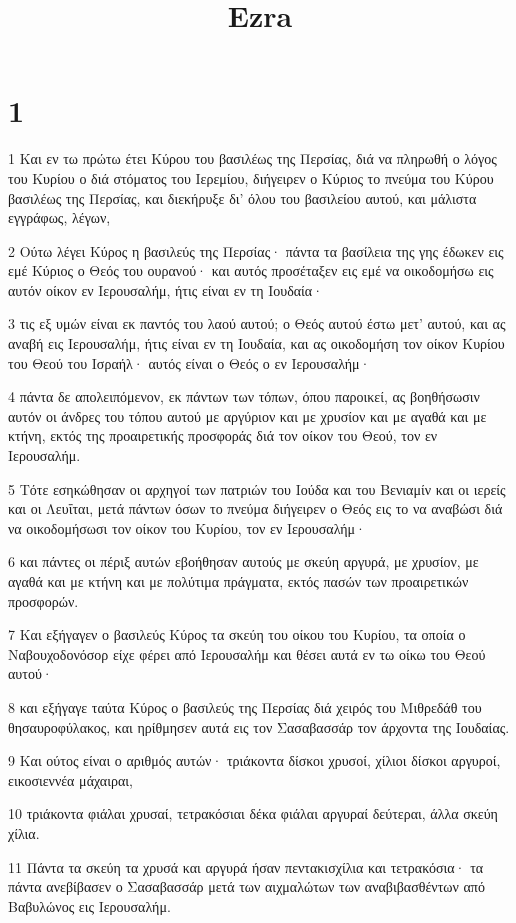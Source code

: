 

\title{Ezra}


\chapter{1}

\par 1 Και εν τω πρώτω έτει Κύρου του βασιλέως της Περσίας, διά να πληρωθή ο λόγος του Κυρίου ο διά στόματος του Ιερεμίου, διήγειρεν ο Κύριος το πνεύμα του Κύρου βασιλέως της Περσίας, και διεκήρυξε δι' όλου του βασιλείου αυτού, και μάλιστα εγγράφως, λέγων,
\par 2 Ούτω λέγει Κύρος η βασιλεύς της Περσίας· πάντα τα βασίλεια της γης έδωκεν εις εμέ Κύριος ο Θεός του ουρανού· και αυτός προσέταξεν εις εμέ να οικοδομήσω εις αυτόν οίκον εν Ιερουσαλήμ, ήτις είναι εν τη Ιουδαία·
\par 3 τις εξ υμών είναι εκ παντός του λαού αυτού; ο Θεός αυτού έστω μετ' αυτού, και ας αναβή εις Ιερουσαλήμ, ήτις είναι εν τη Ιουδαία, και ας οικοδομήση τον οίκον Κυρίου του Θεού του Ισραήλ· αυτός είναι ο Θεός ο εν Ιερουσαλήμ·
\par 4 πάντα δε απολειπόμενον, εκ πάντων των τόπων, όπου παροικεί, ας βοηθήσωσιν αυτόν οι άνδρες του τόπου αυτού με αργύριον και με χρυσίον και με αγαθά και με κτήνη, εκτός της προαιρετικής προσφοράς διά τον οίκον του Θεού, τον εν Ιερουσαλήμ.
\par 5 Τότε εσηκώθησαν οι αρχηγοί των πατριών του Ιούδα και του Βενιαμίν και οι ιερείς και οι Λευΐται, μετά πάντων όσων το πνεύμα διήγειρεν ο Θεός εις το να αναβώσι διά να οικοδομήσωσι τον οίκον του Κυρίου, τον εν Ιερουσαλήμ·
\par 6 και πάντες οι πέριξ αυτών εβοήθησαν αυτούς με σκεύη αργυρά, με χρυσίον, με αγαθά και με κτήνη και με πολύτιμα πράγματα, εκτός πασών των προαιρετικών προσφορών.
\par 7 Και εξήγαγεν ο βασιλεύς Κύρος τα σκεύη του οίκου του Κυρίου, τα οποία ο Ναβουχοδονόσορ είχε φέρει από Ιερουσαλήμ και θέσει αυτά εν τω οίκω του Θεού αυτού·
\par 8 και εξήγαγε ταύτα Κύρος ο βασιλεύς της Περσίας διά χειρός του Μιθρεδάθ του θησαυροφύλακος, και ηρίθμησεν αυτά εις τον Σασαβασσάρ τον άρχοντα της Ιουδαίας.
\par 9 Και ούτος είναι ο αριθμός αυτών· τριάκοντα δίσκοι χρυσοί, χίλιοι δίσκοι αργυροί, εικοσιεννέα μάχαιραι,
\par 10 τριάκοντα φιάλαι χρυσαί, τετρακόσιαι δέκα φιάλαι αργυραί δεύτεραι, άλλα σκεύη χίλια.
\par 11 Πάντα τα σκεύη τα χρυσά και αργυρά ήσαν πεντακισχίλια και τετρακόσια· τα πάντα ανεβίβασεν ο Σασαβασσάρ μετά των αιχμαλώτων των αναβιβασθέντων από Βαβυλώνος εις Ιερουσαλήμ.

